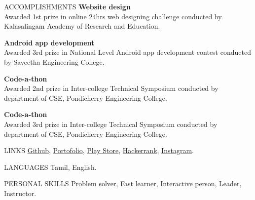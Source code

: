 \documentclass{template}
\begin{document}
\newpage

\begin{rSection}{ACCOMPLISHMENTS}
\textbf{Website design} \\
Awarded 1st prize in online 24hrs web designing challenge conducted by Kalasalingam Academy of Research and Education.

\textbf{Android app development} \\
Awarded 3rd prize in National Level Android app development contest conducted by Saveetha Engineering College.

\textbf{Code-a-thon} \\
Awarded 2nd prize in Inter-college Technical Symposium conducted by department of CSE, Pondicherry Engineering College.

\textbf{Code-a-thon} \\
Awarded 3rd prize in Inter-college Technical Symposium conducted by department of CSE, Pondicherry Engineering College.

\end{rSection}

\begin{rSection}{LINKS}
\href{https://github.com/princesanjivy}{Github},
\href{https://princesanjivy-portfolio.web.app/}{Portofolio},
\href{https://play.google.com/store/apps/dev?id=6439925551269057866}{Play Store},
\href{https://www.hackerrank.com/profile/sanjivy_android}{Hackerrank},
\href{https://www.instagram.com/princesanjivy}{Instagram}.

\end{rSection}

\begin{rSection}{LANGUAGES}
Tamil, English.

\end{rSection}

\begin{rSection}{PERSONAL SKILLS}
Problem solver, Fast learner, Interactive person, Leader, Instructor.

\end{rSection}
\end{document}
